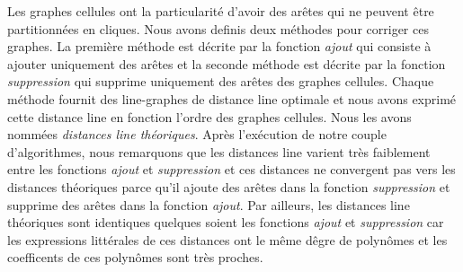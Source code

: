
Les graphes cellules ont la particularit\'e d'avoir des ar\^etes qui ne peuvent \^etre partitionn\'ees en cliques. Nous avons definis deux m\'ethodes pour corriger ces  graphes. La premi\`ere m\'ethode est d\'ecrite par la fonction {\em ajout} qui consiste \`a ajouter uniquement des ar\^etes  et la seconde m\'ethode est d\'ecrite par la fonction {\em suppression} qui supprime uniquement des ar\^etes des graphes cellules. Chaque m\'ethode fournit des line-graphes de distance line optimale et nous avons exprim\'e cette distance line en fonction l'ordre des graphes cellules. Nous les avons nomm\'ees {\em distances line th\'eoriques}.
\newline
Apr\`es l'ex\'ecution de notre couple d'algorithmes, nous remarquons que les distances line varient tr\`es faiblement entre les fonctions {\em ajout} et {\em suppression} et ces distances ne convergent pas vers les distances th\'eoriques parce qu'il ajoute des ar\^etes dans la fonction {\em suppression} et supprime des ar\^etes dans la fonction {\em ajout}.  
Par ailleurs, les distances line th\'eoriques sont identiques quelques soient les fonctions {\em ajout} et {\em suppression} car les expressions litt\'erales de ces distances  ont le m\^eme d\^egre de polyn\^omes et les coefficents de ces polyn\^omes sont tr\`es proches.